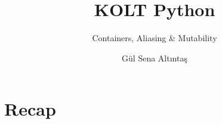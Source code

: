 
\usepackage{../KU-Beamer-Template/style/koc} 
\usepackage{minted}
\usepackage{upquote}
\usepackage{graphicx}
\usepackage{tikz}
\usetikzlibrary{shapes.symbols,positioning, chains}


\title{KOLT Python}
\subtitle{Containers, Aliasing \& Mutability} 
\date{}
\author{Gül Sena Altıntaş}


\makeatletter
\let\@@magyar@captionfix\relax
\makeatother

    \maketitle


    \section*{Recap}

